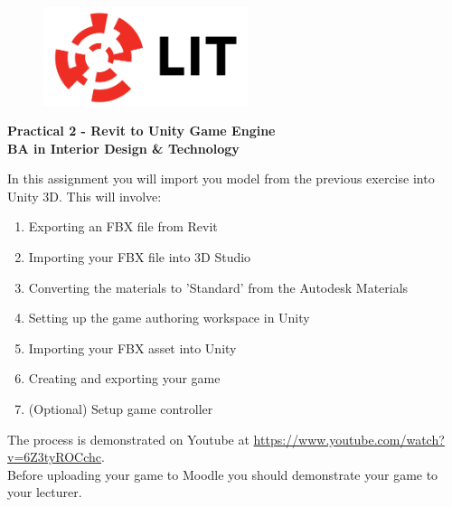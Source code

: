 

\newpage
\setcounter{page}{1}
\begin{center}
	\begin{figure}[ht]
		\centering
		\includegraphics[width = 6cm]{img/LITlogo.jpg}
		\label{fig:logoa2}
	\end{figure}
	\Large\textbf{Practical 2 - Revit to Unity Game Engine}\\
	\large\textbf{BA in Interior Design \& Technology}
\end{center}

In this assignment you will import you model from the previous exercise into Unity 3D.  This will involve:
\begin{enumerate}
	\item Exporting an FBX file from Revit
	\item Importing your FBX file into 3D Studio
	\item Converting the materials to 'Standard' from the Autodesk Materials
	\item Setting up the game authoring workspace in Unity
	\item Importing your FBX asset into Unity
	\item Creating and exporting your game
	\item (Optional) Setup game controller
\end{enumerate}

The process is demonstrated on Youtube at \href{https://www.youtube.com/watch?v=6Z3tyROCchc}{https://www.youtube.com/watch?v=6Z3tyROCchc}.
\\

Before uploading your game to Moodle you should demonstrate your game to your lecturer.

